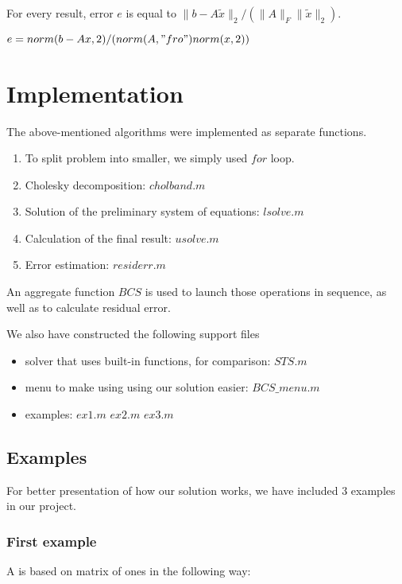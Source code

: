 \documentclass{article}
\begin{document}
For every result, error $e$ is equal to $\|b-A\tilde{x}\|_2 /( \|A\|_F
\|\tilde{x}\|_2 )$.

\begin{algorithmic}
\STATE $e = norm(b-Ax,2) / (norm(A,"fro") norm(x,2))$
\end{algorithmic}

\section{Implementation}

The above-mentioned algorithms were implemented as separate functions.

\begin{enumerate}
	\item To split problem into smaller, we simply used $for$ loop.
	\item Cholesky decomposition: $cholband.m$
	\item Solution of the preliminary system of equations: $lsolve.m$
	\item Calculation of the final result: $usolve.m$
	\item Error estimation: $residerr.m$
\end{enumerate}

An aggregate function $BCS$ is used to launch those operations in sequence, as
well as to calculate residual error.

We also have constructed the following support files
\begin{itemize}
	\item solver that uses built-in functions, for comparison: $STS.m$
	\item menu to make using using our solution easier: $BCS\_menu.m$
	\item examples: $ex1.m$ $ex2.m$ $ex3.m$ 
\end{itemize}

\subsection{Examples}

For better presentation of how our solution works, we have included 3 examples
in our project.

\subsubsection{First example}

A is based on matrix of ones in the following way:
\end{document}

